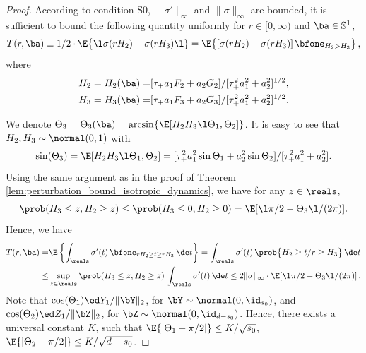 \documentclass[11pt]{article}
\begin{document}
\begin{proof}
According to condition {\sf S0}, $\| \sigma'\|_\infty$ and $\| \sigma \|_\infty$ are bounded, it is sufficient to bound the following quantity uniformly for $r \in [0, \infty)$ and $\ba \in \mathbb S^1$,
\begin{equation}
T(r, \ba) \equiv 1/2 \cdot \E\big\{ \l \sigma(r H_2) - \sigma(r H_3) \l \}= \E\big\{ [ \sigma(r H_2) - \sigma(r H_3)]\, \bfone_{H_2>H_3}\big\}\,,
\end{equation}
where
\begin{align}
H_2 = H_2(\ba) = & [\tau_{+} a_1 F_2 + a_2 G_2]/[\tau_{+}^2 a_1^2 +  a_2^2]^{1/2},\\
H_3 = H_3(\ba) =& [\tau_{+} a_1 F_3 + a_2 G_3]/[\tau_{+}^2 a_1^2 + a_2^2]^{1/2}. 
\end{align}

We denote $\Theta_3 = \Theta_3(\ba)= \arcsin\{\E[H_2 H_3 \l \Theta_1, \Theta_2]\}$. It is easy to see that $H_2, H_3 \sim \normal(0, 1)$ with 
\begin{equation}\label{eqn:Theta3_in_anisotropic_proof}
\sin(\Theta_3) = \E[H_2 H_3 \l \Theta_1, \Theta_2] = [\tau_{+}^2 a_1^2 \sin \Theta_1 +  a_2^2 \sin \Theta_2]/ [\tau_{+}^2 a_1^2 + a_2^2]. 
\end{equation}
Using the same argument as in the proof of Theorem \ref{lem:perturbation_bound_isotropic_dynamics}, we have for any $z \in\reals$,
%
\begin{align}\label{eqn:Gaussian_inequality_in_perturbation_proof_anisotropic}
\prob(H_3 \le z, H_2 \ge z) \le \prob(H_3 \le 0, H_2 \ge 0) = \E[\l \pi/2-\Theta_3\l /(2\pi)].
\end{align}
%
Hence, we have 
%
\begin{align*}
%
T(r, \ba) =& \E\left\{\int_\reals \sigma'(t) \, \bfone_{rH_2\ge t\ge rH_3}\, \de t\right\} =  \int_\reals \sigma'(t) \, \prob\big\{H_2\ge t/r\ge H_3\big\}\, \de t\\
\le & \sup_{z\in \reals} \prob(H_3 \le z, H_2 \ge z) \, \int_\reals \sigma'(t)\, \de t \le  2\|\sigma\|_{\infty} \cdot \E[\l \pi/2-\Theta_3\l /(2\pi)]\, .
\end{align*}
%
Note that $\cos(\Theta_1) \ed Y_{1}/\|\bY\|_2$, for $\bY \sim\normal(0,\id_{s_0})$, and $\cos(\Theta_2) \ed Z_{1}/\|\bZ\|_2$, for $\bZ\sim\normal(0,\id_{d-s_0})$. Hence, there exists a universal constant $K$, such that $\E\{|\Theta_1-\pi/2|\} \le K/\sqrt{s_0}$, $\E\{|\Theta_2-\pi/2|\} \le K/\sqrt{d - s_0}$. 


\end{proof}
\end{document}
